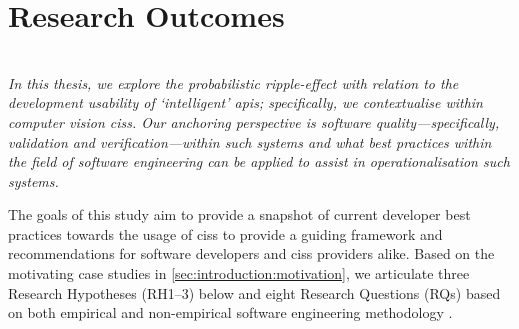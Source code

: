 \section{Research Outcomes}
\label{sec:introduction:hypohtesis}

\\
\itshape
In this thesis, we explore the probabilistic ripple-effect with relation to the development usability of `intelligent' \glspl{api}; specifically, we contextualise within computer vision \glspl{cis}. Our anchoring perspective is software quality---specifically, validation and verification---within such systems and what best practices within the field of software engineering can be applied to assist in operationalisation such systems.
\upshape

The goals of this study aim to provide a snapshot of current developer best practices towards the usage of \glspl{cis} to provide a guiding framework and recommendations for software developers and \glspl{cis} providers alike. Based on the motivating case studies in \cref{sec:introduction:motivation}, we articulate three Research Hypotheses (RH1--3) below and eight Research Questions (RQs) based on  both empirical and non-empirical software engineering methodology \citep{Shull:2007vh,Simon:1996uw}.

